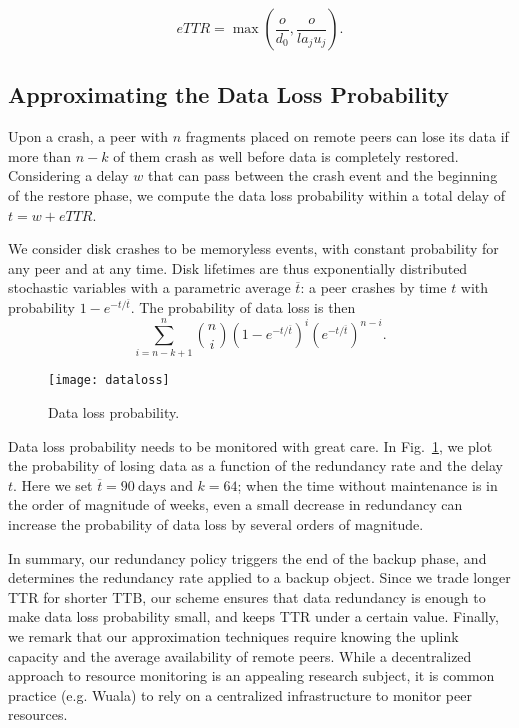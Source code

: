 \documentclass[conference,10pt]{IEEEtran}
\begin{document}
\begin{equation}
eTTR = \max \left(\frac o {d_0}, \frac o {l a_j u_j} \right).
\label{eq:eTTR}
\end{equation}

\subsection{Approximating the Data Loss Probability}
\label{sec:dataloss}

Upon a crash, a peer with $n$ fragments placed on remote peers can lose its data if more than $n - k$ of them crash as well before data is completely restored. Considering a delay $w$ that can pass between the crash event and the beginning of the restore phase, we compute the data loss probability within a total delay of $t = w + eTTR$.

We consider disk crashes to be memoryless events, with constant probability for any peer and at any time. Disk lifetimes are thus exponentially distributed stochastic variables with a parametric average $\overline t$: a peer crashes by time $t$ with probability $1 - e^{-t/\overline t}$. The probability of data loss is then
\begin{equation}
\sum_{i=n-k+1}^{n}{n \choose
  i}\left(1-e^{-t/\overline{t}}\right)^{i}\left(e^{-t/\overline{t}}\right)^{n-i}.
\label{eq:dataloss}
\end{equation}

\begin{figure}
\centering
\texttt{[image: dataloss]}
\caption{Data loss probability.}
\label{fig:dataloss}
\end{figure}

Data loss probability needs to be monitored with great care. In Fig.~\ref{fig:dataloss}, we plot the probability of losing data as a function of the redundancy rate and the delay $t$. Here we set $\overline t=90~\mathrm{days}$ and $k=64$; when the time without maintenance is in the order of magnitude of weeks, even a small decrease in redundancy can increase the probability of data loss by several orders of magnitude.


In summary, our redundancy policy triggers the end of the backup phase, and determines the redundancy rate applied to a backup object. Since we trade longer TTR for shorter TTB, our scheme ensures that data redundancy is enough to make data loss probability small, and keeps TTR under a certain value.
Finally, we remark that our approximation techniques require knowing the uplink capacity and the average availability of remote peers. While a decentralized approach to resource monitoring is an appealing research subject, it is common practice (e.g. Wuala) to rely on a centralized infrastructure to monitor peer resources.
\end{document}
